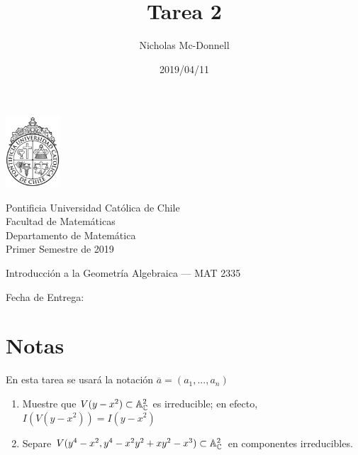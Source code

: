 

\title{Tarea 2}
\author{Nicholas Mc-Donnell}
\date{2019/04/11}



\begin{minipage}{2.5cm}
    \includegraphics[width=2cm]{../../figures/logo1.jpg}
\end{minipage}
\begin{minipage}{13cm}
    \begin{flushleft}
        \raggedright{
            \noindent
            {\sc Pontificia Universidad Católica de Chile\\
                Facultad de Matemáticas\\
                Departamento de Matemática} \smallskip \\
            Primer Semestre de 2019\\
        }
    \end{flushleft}
\end{minipage}

\vspace{2ex}
{\Large \centerline{\bf \thetitle}}
{\large \centerline{Introducción a la Geometría Algebraica --- MAT 2335}}
{\normalsize \centerline{ Fecha de Entrega: \thedate}}
\vfill

\begin{flushright}
    {\large\theauthor}
\end{flushright}
\newpage
\normalsize
{}
\tableofcontents
\newpage

\section*{Notas}
En esta tarea se usará la notación \(\overline{a}=(a_1,...,a_n)\)

\begin{prob}{1.25}
    \begin{enumerate}[label= (\alph*)]
        \item Muestre que \(V(y-x^2)\subset\mathbb{A}_{\mathbb{C}}^2\) es irreducible; en efecto, \(I(V(y-x^2))=I(y-x^2)\)
        \item Separe \(V(y^4-x^2,y^4-x^2y^2+xy^2-x^3)\subset\mathbb{A}_{\mathbb{C}}^2\) en componentes irreducibles.
    \end{enumerate}
\end{prob}


